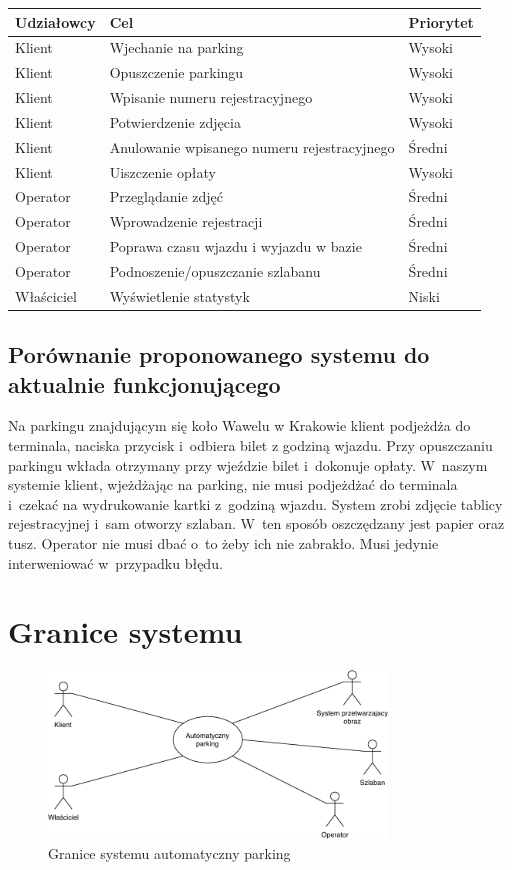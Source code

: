 \begin{table}[H]
	\begin{tabular}{|l|l|l|} \hline
	\textbf{Udziałowcy}	& \textbf{Cel} & \textbf{Priorytet} \\ \hline%
	Klient	& Wjechanie na parking & Wysoki \\
	Klient	& Opuszczenie parkingu & Wysoki \\
	Klient	& Wpisanie numeru rejestracyjnego & Wysoki \\
	Klient	& Potwierdzenie zdjęcia & Wysoki \\
	Klient	& Anulowanie wpisanego numeru rejestracyjnego & Średni \\
	Klient	& Uiszczenie opłaty & Wysoki \\
	Operator& Przeglądanie zdjęć & Średni \\
	Operator& Wprowadzenie rejestracji & Średni \\
	Operator& Poprawa czasu wjazdu i wyjazdu w bazie & Średni \\
	Operator& Podnoszenie/opuszczanie szlabanu & Średni \\
	Właściciel& Wyświetlenie statystyk & Niski \\ \hline
	\end{tabular}
\end{table}

\subsection{Porównanie proponowanego systemu do aktualnie funkcjonującego}
Na parkingu znajdującym się koło Wawelu w Krakowie klient podjeżdża do terminala, naciska przycisk i~odbiera bilet z godziną wjazdu. Przy opuszczaniu parkingu wkłada otrzymany przy wjeździe bilet i~dokonuje opłaty.
W~naszym systemie klient, wjeżdżając na parking, nie musi podjeżdżać do terminala i~czekać na wydrukowanie kartki z~godziną wjazdu. System zrobi zdjęcie tablicy rejestracyjnej i~sam otworzy szlaban. W~ten sposób oszczędzany jest papier oraz tusz. Operator nie musi dbać o~to żeby ich nie zabrakło. Musi jedynie interweniować w~przypadku błędu.


\section{Granice systemu}
\begin{figure}[H]
	\centering
	\includegraphics[width=90mm]{diagramy/graniceSystemu.pdf}
	\caption{Granice systemu automatyczny parking }
\end{figure}

